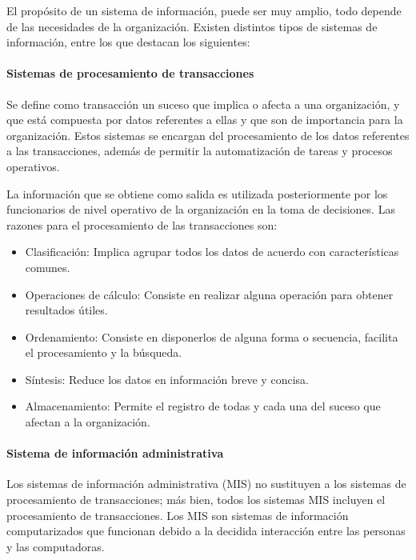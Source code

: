 El propósito de un sistema de información, puede ser muy amplio, todo depende de las necesidades de la organización. Existen distintos tipos de sistemas de información, entre los que destacan los siguientes\cite{kendall2005analisis}:

\setcounter{secnumdepth}{3}
\paragraph{Sistemas de procesamiento de transacciones}

Se define como transacción un suceso que implica o afecta a una organización, y que está compuesta por datos referentes a ellas y que son de importancia para la organización\cite{kendall2005analisis}. Estos sistemas se encargan del procesamiento de los datos referentes a las transacciones, además de permitir la automatización de tareas y procesos operativos. 

La información que se obtiene como salida es utilizada posteriormente por los funcionarios de nivel operativo de la organización en la toma de decisiones. Las razones para el procesamiento de las transacciones son:  

\begin{itemize}
\item Clasificación: Implica agrupar todos los datos de acuerdo con características comunes.
\item Operaciones de cálculo: Consiste en realizar alguna operación para obtener resultados útiles.  
\item Ordenamiento: Consiste en disponerlos de alguna forma o secuencia, facilita el procesamiento y la búsqueda.  
\item Síntesis: Reduce los datos en información breve y concisa. 
\item Almacenamiento: Permite el registro de todas y cada una del suceso que afectan a la organización.

\end{itemize}

\paragraph{Sistema de información administrativa}

Los sistemas de información administrativa (MIS) no sustituyen a los sistemas de procesamiento de transacciones; más bien, todos los sistemas MIS incluyen el procesamiento de transacciones\cite{kendall2005analisis}. Los MIS son sistemas de información computarizados que funcionan debido a la decidida interacción entre las personas y las computadoras.

